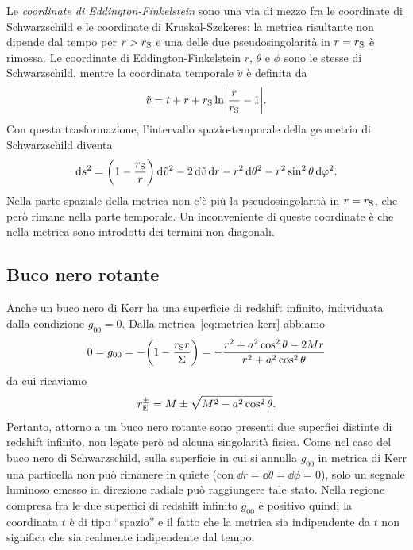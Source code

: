 Le \emph{coordinate di
  Eddington-Finkelstein} sono una via di mezzo fra le coordinate di
Schwarzschild e le coordinate di Kruskal-Szekeres: la metrica risultante non
dipende dal tempo per \(r > r_{\textup{S}}\) e una delle due pseudosingolarità
in \(r = r_{\textup{S}}\) è rimossa.  Le coordinate di Eddington-Finkelstein
\(r\), \(\theta\) e \(\phi\) sono le stesse di Schwarzschild, mentre la
coordinata temporale \(\tilde{v}\) è definita
da~\parencites{1924Natur.113..192E}{1958PhRv..110..965F}
\begin{equation}
  \tilde{v} = t + r + r_{\textup{S}} \ln\abs*{\frac{r}{r_{\textup{S}}} - 1}.
\end{equation}
Con questa trasformazione, l'intervallo spazio-temporale della geometria di
Schwarzschild diventa
\begin{equation}
  \mathop{}\!\mathrm{d} s^{2} = \biggl(1 - \frac{r_{\textup{S}}}{r}\biggr)\mathop{}\!\mathrm{d}\tilde{v}^{2} -
  2\mathop{}\!\mathrm{d}\tilde{v}\mathop{}\!\mathrm{d} r - r^{2}\mathop{}\!\mathrm{d}\theta^{2} - r^{2}\sin^{2}\theta\mathop{}\!\mathrm{d}\varphi^{2}.
\end{equation}
Nella parte spaziale della metrica non c'è più la pseudosingolarità in \(r =
r_{\textup{S}}\), che però rimane nella parte temporale.  Un inconveniente di
queste coordinate è che nella metrica sono introdotti dei termini non diagonali.

\subsection{Buco nero rotante}
\label{sec:singolarita-kerr}

Anche un buco nero di Kerr ha una superficie di redshift infinito, individuata
dalla condizione \(g_{00} = 0\).  Dalla metrica~\eqref{eq:metrica-kerr} abbiamo
\begin{equation}
  0 = g_{00} = -\biggl(1 - \frac{r_{\textup{S}}r}{\Sigma}\biggr) = -\frac{r^{2}
    + a^{2}\cos^{2}\theta - 2 Mr}{r^{2} + a^{2}\cos^{2}\theta}
\end{equation}
da cui ricaviamo
\begin{equation}
  r_{\textup{E}}^{\pm} = M \pm \sqrt{M^{2} - a^{2}\cos^{2}\theta}.
\end{equation}
Pertanto, attorno a un buco nero rotante sono presenti due superfici distinte di
redshift infinito, non legate però ad alcuna singolarità fisica.  Come nel caso
del buco nero di Schwarzschild, sulla superficie in cui si annulla \(g_{00}\) in
metrica di Kerr una particella non può rimanere in quiete (con \(\dd r =
\dd\theta = \dd\phi = 0\)), solo un segnale luminoso emesso in direzione radiale
può raggiungere tale stato.  Nella regione compresa fra le due superfici di
redshift infinito \(g_{00}\) è positivo quindi la coordinata \(t\) è di tipo
``spazio'' e il fatto che la metrica sia indipendente da \(t\) non significa che
sia realmente indipendente dal tempo.

